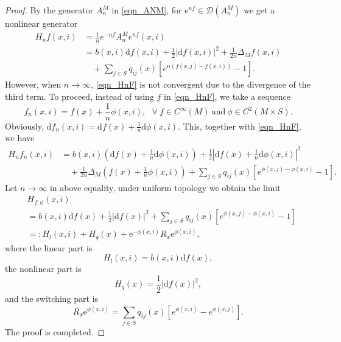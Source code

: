 \documentclass[a4paper]{article}
\numberwithin{equation}{section}
\theoremstyle{definition}
\begin{document}
\begin{proof}
By the generator $A^M_n$ in \eqref{eqn_ANM}, for $\mathrm{e}^{nf}\in \mathcal{D}(A^M_n)$ we get a nonlinear generator
\begin{equation}\label{eqn_HnF}
\begin{split}
   H_nf(x,i)&=\frac{1}{n}e^{-nf}A_n^Me^{nf}(x,i)\\
    &= b(x,i)\mathrm{d} f(x,i)+\frac{1}{2}|\mathrm{d}  f(x,i)|^2+\frac{1}{2n}\Delta_Mf(x,i)\\
    &\quad+\sum_{j\in S}q_{ij}(x)[e^{n(f(x,j)-f(x,i))}-1].
\end{split}
\end{equation}
However, when $n\to \infty$, \eqref{eqn_HnF} is not convergent due to the divergence of the third term. To proceed, instead of using $f$ in \eqref{eqn_HnF}, we take a sequence 
\begin{equation*}
    f_n(x,i)=f(x)+\frac{1}{n}\phi(x,i),~~~\forall~f\in C^\infty(M)~\mbox{and}~\phi\in C^2(M\times S).
\end{equation*}
Obviously, $\mathrm{d}f_n(x,i)=\mathrm{d}f(x)+\frac{1}{n}\mathrm{d}\phi(x,i)$. This, together with \eqref{eqn_HnF}, we have
\begin{align*}
    H_nf_n(x,i)
    &=b(x,i) \left(\mathrm{d}f(x)+\frac{1}{n}\mathrm{d}\phi(x,i)\right)+\frac{1}{2} \left|\mathrm{d}f(x)+\frac{1}{n}\mathrm{d}\phi(x,i)\right|^2\\
    &\quad+\frac{1}{2n}\Delta_M\left(f(x)+\frac{1}{n}\phi(x,i)\right)+\sum_{j\in S}q_{ij}(x)[e^{\phi(x,j)-\phi(x,i)}-1].
\end{align*}
Let $n\to \infty$ in above equality, under uniform topology we obtain the limit
\begin{equation*}
\begin{split}
    &H_{f,\phi}(x,i)\\
    &=b(x,i) \mathrm{d} f(x)+\frac{1}{2}
    \left|\mathrm{d}  f(x)\right|^2+\sum_{j\in S}q_{ij}(x)[e^{\phi(x,j)-\phi(x,i)}-1]\\
&=:H_l(x,i)+H_q(x)+\mathrm{e}^{-\phi(x,i)}R_x\mathrm{e}^{\phi(x,i)}, 
\end{split}
\end{equation*}
where the linear part is
\begin{equation*}
    H_l(x,i)=b(x,i)\text{d} f(x),
\end{equation*}
the nonlinear part is
\begin{equation}\label{eqn_Hq}
   H_q(x)=\frac{1}{2}
   \left|\mathrm{d}  f(x)\right|^2,
\end{equation}
and the switching part is
\begin{equation*}
  R_x \mathrm{e}^{\phi(x,i)}=\sum_{j\in S}q_{ij}(x)[e^{\phi(x,i)}-e^{\phi(x,j)}].
\end{equation*}
The proof is completed.
\end{proof}
\end{document}
